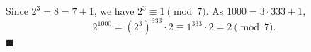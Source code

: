 Since $2^3=8=7+1$, we have $2^3\equiv1\pmod7$. As $1000=3\cdot333+1$,
\[
2^{1000}=\left(2^3\right)^{333}\cdot2\equiv1^{333}\cdot2=2\pmod 7 .
\]
$\blacksquare$
